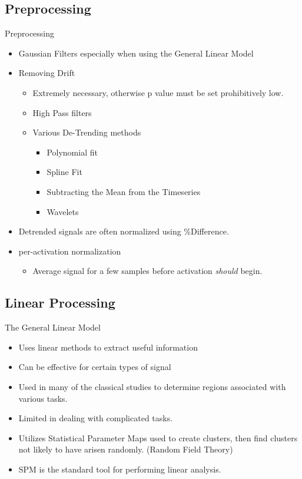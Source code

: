 \documentclass{beamer}
\begin{document}
\subsection{Preprocessing}
\begin{frame}{Preprocessing}
\begin{itemize}
    \item Gaussian Filters especially when using the General Linear Model
    \item Removing Drift
    \begin{itemize}
        \item Extremely necessary, otherwise p value must be set prohibitively low. \cite{ISI:000246766700003}
        \item High Pass filters
        \item Various De-Trending methods 
        \begin{itemize}
            \item Polynomial fit
            \item Spline Fit
            \item Subtracting the Mean from the Timeseries
            \item Wavelets
        \end{itemize}
    \end{itemize}
     \item Detrended signals are often normalized using \%Difference.
    \item per-activation normalization
    \begin{itemize}
        \item Average signal for a few samples before activation \emph{should} begin.
    \end{itemize}
\end{itemize}
\end{frame}

\subsection{Linear Processing}
\begin{frame}{The General Linear Model}
\begin{itemize}
    \item Uses linear methods to extract useful information
    \item Can be effective for certain types of signal
    \item Used in many of the classical studies to determine regions
        associated with various tasks.
    \item Limited in dealing with complicated tasks.
    \item Utilizes Statistical Parameter Maps used to create clusters, then find 
        clusters not likely to have arisen randomly. (Random Field Theory)
    \item SPM is the standard tool for performing linear analysis.
\end{itemize}
\end{frame}
\end{document}
